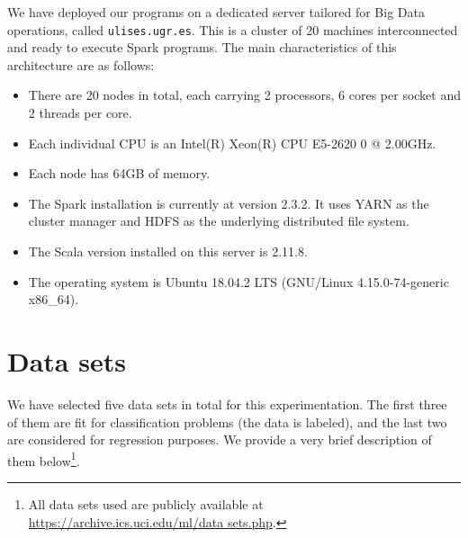 We have deployed our programs on a dedicated server tailored for Big Data operations, called \verb|ulises.ugr.es|. This is a cluster of 20 machines interconnected and ready to execute Spark programs. The main characteristics of this architecture are as follows:

\begin{itemize}
  \item There are 20 nodes in total, each carrying 2 processors, 6 cores per socket and 2 threads per core.
  \item Each individual CPU is an Intel(R) Xeon(R) CPU E5-2620 0 @ 2.00GHz.
  \item Each node has 64GB of memory.
  \item The Spark installation is currently at version 2.3.2. It uses YARN as the cluster manager and HDFS as the underlying distributed file system.
  \item The Scala version installed on this server is 2.11.8.
  \item The operating system is Ubuntu 18.04.2 LTS (GNU/Linux 4.15.0-74-generic x86\_64).
\end{itemize}

\section{Data sets}

We have selected five data sets in total for this experimentation. The first three of them are fit for classification problems (the data is labeled), and the last two are considered for regression purposes. We provide a very brief description of them below\footnote{All data sets used are publicly available at \url{https://archive.ics.uci.edu/ml/data sets.php}.}.

